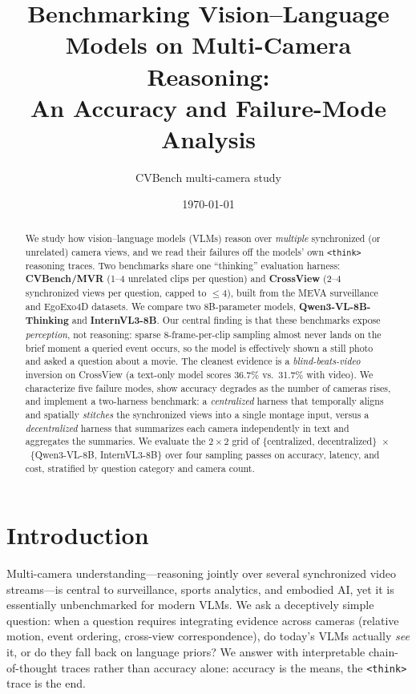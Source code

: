 \documentclass[11pt]{article}
\title{Benchmarking Vision--Language Models on Multi-Camera Reasoning:\\
       An Accuracy and Failure-Mode Analysis}
\author{CVBench multi-camera study}
\date{\today}
\begin{document}
\maketitle

\begin{abstract}
We study how vision--language models (VLMs) reason over \emph{multiple} synchronized (or
unrelated) camera views, and we read their failures off the models' own \texttt{<think>}
reasoning traces. Two benchmarks share one ``thinking'' evaluation harness: \textbf{CVBench/MVR}
(1--4 unrelated clips per question) and \textbf{CrossView} (2--4 synchronized views per question,
capped to $\le 4$), built from the MEVA surveillance and EgoExo4D datasets. We compare two
8B-parameter models, \textbf{Qwen3-VL-8B-Thinking} and \textbf{InternVL3-8B}. Our central finding
is that these benchmarks expose \emph{perception}, not reasoning: sparse 8-frame-per-clip sampling
almost never lands on the brief moment a queried event occurs, so the model is effectively shown a
still photo and asked a question about a movie. The cleanest evidence is a \emph{blind-beats-video}
inversion on CrossView (a text-only model scores 36.7\% vs.\ 31.7\% with
video). We characterize five failure modes, show accuracy degrades as the number of cameras rises,
and implement a two-harness benchmark: a \emph{centralized} harness that temporally aligns and
spatially \emph{stitches} the synchronized views into a single montage input, versus a
\emph{decentralized} harness that summarizes each camera independently in text and aggregates the
summaries. We evaluate the $2{\times}2$ grid of \{centralized, decentralized\}~$\times$~\{Qwen3-VL-8B,
InternVL3-8B\} over four sampling passes on accuracy, latency, and cost, stratified by question
category and camera count.
\end{abstract}

\section{Introduction}
Multi-camera understanding---reasoning jointly over several synchronized video streams---is central
to surveillance, sports analytics, and embodied AI, yet it is essentially unbenchmarked for modern
VLMs. We ask a deceptively simple question: when a question requires integrating evidence across
cameras (relative motion, event ordering, cross-view correspondence), do today's VLMs actually
\emph{see} it, or do they fall back on language priors? We answer with interpretable
chain-of-thought traces rather than accuracy alone: accuracy is the means, the \texttt{<think>}
trace is the end.
\end{document}
